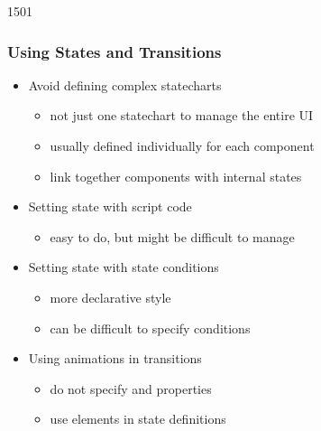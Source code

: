 \begin{slide}{1501}\frametitle{Using States and Transitions}

\begin{itemize}
\item Avoid defining complex statecharts
  \begin{itemize}
  \item not just one statechart to manage the entire UI
  \item usually defined individually for each component
  \item link together components with internal states
  \end{itemize}
\item Setting state with script code
  \begin{itemize}
  \item easy to do, but might be difficult to manage
  \end{itemize}
\item Setting state with state conditions
  \begin{itemize}
  \item more declarative style
  \item can be difficult to specify conditions
  \end{itemize}
\item Using animations in transitions
  \begin{itemize}
  \item do not specify  and  properties
  \item use  elements in state definitions
  \end{itemize}
\end{itemize}


\end{slide}



